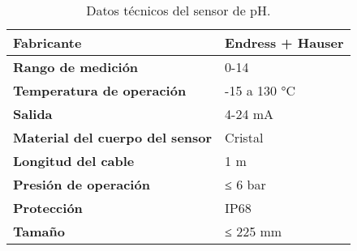 

\renewcommand{\arraystretch}{2}
\begin{table}[H]
    \centering
    \caption{Datos técnicos del sensor de pH.}
    \label{table:sensor_ph}
    \begin{tabular}{| L{5cm} | L{5cm} |}
        \hline
        \textbf{Fabricante} & Endress + Hauser  \\
        \hline
        \textbf{Rango de medición} & 0-14  \\
        \hline
        \textbf{Temperatura de operación} & -15 a 130 °C  \\
        \hline
        \textbf{Salida} & 4-24 mA  \\
        \hline
        \textbf{Material del cuerpo del sensor} & Cristal  \\
        \hline
        \textbf{Longitud del cable} & 1 m  \\
        \hline
        \textbf{Presión de operación} & ≤ 6 bar  \\
        \hline
        \textbf{Protección} & IP68  \\
        \hline
        \textbf{Tamaño} & ≤ 225 mm  \\
        \hline
    \end{tabular}
\end{table}